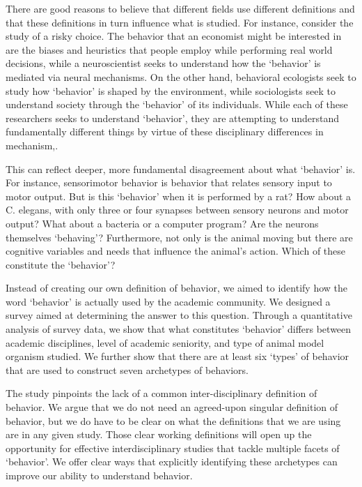 \documentclass[a4paper, 11pt]{article}
\begin{document}
There are good reasons to believe that different fields use different definitions and that these definitions in turn influence what is studied. For instance, consider the study of a risky choice. The behavior that an economist might be interested in are the biases and heuristics that people employ while performing real world decisions, while a neuroscientist seeks to understand how the `behavior' is mediated via neural mechanisms. On the other hand, behavioral ecologists seek to study how `behavior' is shaped by the environment, while sociologists seek to understand society through the `behavior' of its individuals. While each of these researchers seeks to understand `behavior', they are attempting to understand fundamentally different things by virtue of these disciplinary differences in mechanism,.

This can reflect deeper, more fundamental disagreement about what `behavior' is. For instance, sensorimotor behavior is behavior that relates sensory input to motor output. But is this `behavior' when it is performed by a rat? How about a C. elegans, with only three or four synapses between sensory neurons and motor output? What about a bacteria or a computer program? Are the neurons themselves `behaving'? Furthermore, not only is the animal moving but there are cognitive variables and needs that influence the animal's action. Which of these constitute the `behavior'?

Instead of creating our own definition of behavior, we aimed to identify how the word `behavior' is actually used by the academic community. We designed a survey aimed at determining the answer to this question. Through a quantitative analysis of survey data, we show that what constitutes `behavior' differs between academic disciplines, level of academic seniority, and type of animal model organism studied. We further show that there are at least six `types' of behavior that are used to construct seven archetypes of behaviors. 

The study pinpoints the lack of a common inter-disciplinary definition of behavior. We argue that we do not need an agreed-upon singular definition of behavior, but we do have to be clear on what the definitions that we are using are in any given study. Those clear working definitions will open up the opportunity for effective interdisciplinary studies that tackle multiple facets of `behavior'. We offer clear ways that explicitly identifying these archetypes can improve our ability to understand behavior.

\vspace{24pt}
\end{document}
